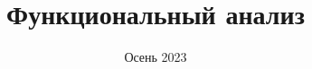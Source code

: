 \documentclass[12pt, a4paper, oneside]{memoir}
\title{Функциональный анализ}
\date{Осень 2023}
\begin{document}
\begin{titlingpage}
    \maketitle
\end{titlingpage}


\tableofcontents




\end{document}
